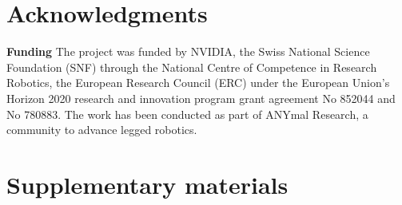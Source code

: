 \documentclass[conference]{IEEEtran}
\begin{document}
\section{Acknowledgments}
\textbf{Funding}
The project was funded by NVIDIA, the Swiss National Science Foundation (SNF) through the National Centre of Competence in Research Robotics, the European Research Council (ERC) under the European Union’s Horizon 2020 research and innovation program grant agreement No 852044 and No 780883. The work has been conducted as part of ANYmal Research, a community to advance legged robotics.






\clearpage
\setcounter{table}{0}
\makeatletter 
\renewcommand{\thetable}{S\@arabic\c@table}
\makeatother

\setcounter{figure}{0}
\makeatletter 
\renewcommand{\thefigure}{S\@arabic\c@figure}
\makeatother

\section*{Supplementary materials}
\end{document}
